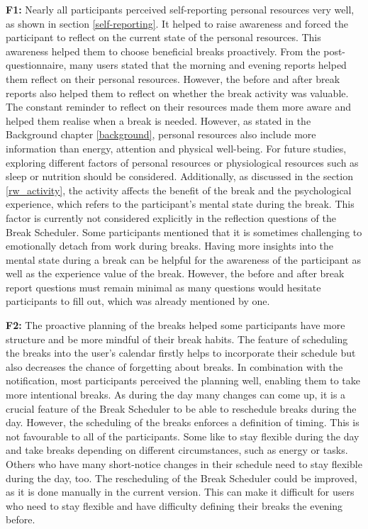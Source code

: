 \documentclass{hasel_thesis}
\begin{document}
\textbf{F1:} Nearly all participants perceived self-reporting personal resources very well, as shown in section \ref{self-reporting}. It helped to raise awareness and forced the participant to reflect on the current state of the personal resources. This awareness helped them to choose beneficial breaks proactively. From the post-questionnaire, many users stated that the morning and evening reports helped them reflect on their personal resources. However, the before and after break reports also helped them to reflect on whether the break activity was valuable. The constant reminder to reflect on their resources made them more aware and helped them realise when a break is needed. However, as stated in the Background chapter \ref{background}, personal resources also include more information than energy, attention and physical well-being. For future studies, exploring different factors of personal resources or physiological resources such as sleep or nutrition should be considered. Additionally, as discussed in the section \ref{rw_activity}, the activity affects the benefit of the break and the psychological experience, which refers to the participant's mental state during the break. This factor is currently not considered explicitly in the reflection questions of the Break Scheduler. Some participants mentioned that it is sometimes challenging to emotionally detach from work during breaks. Having more insights into the mental state during a break can be helpful for the awareness of the participant as well as the experience value of the break. However, the before and after break report questions must remain minimal as many questions would hesitate participants to fill out, which was already mentioned by one.


\textbf{F2:} The proactive planning of the breaks helped some participants have more structure and be more mindful of their break habits. The feature of scheduling the breaks into the user's calendar firstly helps to incorporate their schedule but also decreases the chance of forgetting about breaks. In combination with the notification, most participants perceived the planning well, enabling them to take more intentional breaks. As during the day many changes can come up, it is a crucial feature of the Break Scheduler to be able to reschedule breaks during the day. However, the scheduling of the breaks enforces a definition of timing. This is not favourable to all of the participants. Some like to stay flexible during the day and take breaks depending on different circumstances, such as energy or tasks. Others who have many short-notice changes in their schedule need to stay flexible during the day, too. The rescheduling of the Break Scheduler could be improved, as it is done manually in the current version. This can make it difficult for users who need to stay flexible and have difficulty defining their breaks the evening before.
\end{document}
